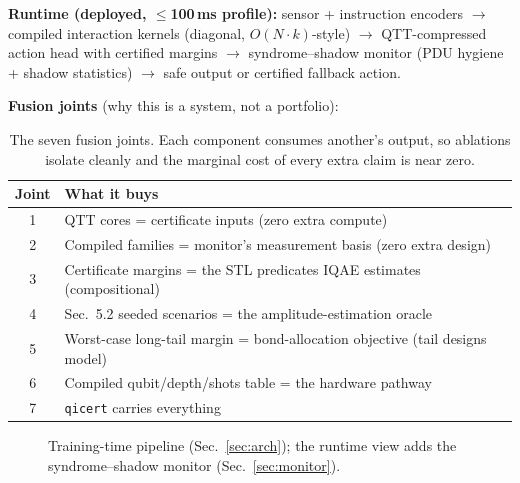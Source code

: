 \documentclass[conference,10pt]{IEEEtran}
\begin{document}
\textbf{Runtime (deployed, $\leq$100\,ms profile):}
sensor + instruction encoders $\rightarrow$ compiled interaction kernels
(diagonal, $O(N\cdot k)$-style) $\rightarrow$ QTT-compressed action head with
certified margins $\rightarrow$ syndrome--shadow monitor (PDU hygiene + shadow
statistics) $\rightarrow$ safe output or certified fallback action.

\textbf{Fusion joints} (why this is a system, not a portfolio):
\begin{table}[!t]
\caption{The seven fusion joints. Each component consumes another's output, so
ablations isolate cleanly and the marginal cost of every extra claim is near zero.}
\label{tab:joints}
\centering
\small
\begin{tabular}{@{}cl@{}}
\toprule
\textbf{Joint} & \textbf{What it buys} \\
\midrule
1 & QTT cores = certificate inputs (zero extra compute) \\
2 & Compiled families = monitor's measurement basis (zero extra design) \\
3 & Certificate margins = the STL predicates IQAE estimates (compositional) \\
4 & Sec.~5.2 seeded scenarios = the amplitude-estimation oracle \\
5 & Worst-case long-tail margin = bond-allocation objective (tail designs model) \\
6 & Compiled qubit/depth/shots table = the hardware pathway \\
7 & \texttt{qicert} carries everything \\
\bottomrule
\end{tabular}
\end{table}

\begin{figure}[!t]
\centering
{}
\caption{Training-time pipeline (Sec.~\ref{sec:arch}); the runtime view adds the
syndrome--shadow monitor (Sec.~\ref{sec:monitor}).}
\label{fig:pipeline}
\end{figure}
\end{document}
